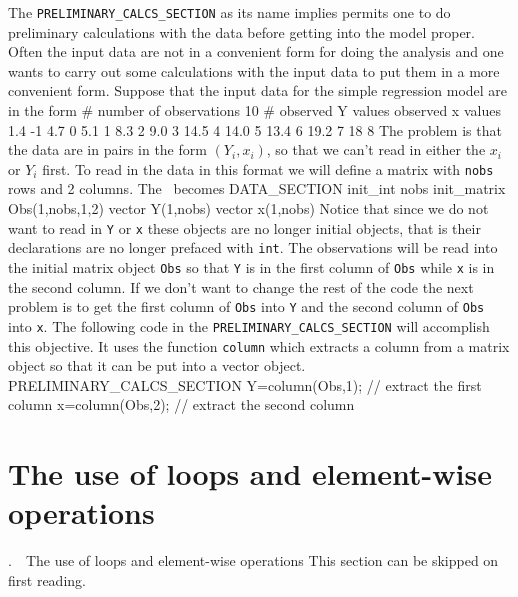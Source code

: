 \documentclass[12pt]{book}
\makeatletter
\def\mysection#1{\section{#1}{\bigbf \medbreak\noindent\number\c@chapter.\number\c@section\ \ #1\medbreak}}
\makeatother
\begin{document}
The {\tt PRELIMINARY\_CALCS\_SECTION} as its name implies
permits one to do preliminary calculations with the data
before getting into
the model proper.  Often the input data are not in a convenient form
for doing the analysis and one wants to carry out some calculations with
the input data to put them in a more convenient form.
Suppose that the input data for the simple regression model are in the form
\beginexample
# number of observations
     10
# observed Y values  observed x values
    1.4                    -1
    4.7                     0
    5.1                     1
    8.3                     2
    9.0                     3
    14.5                    4
    14.0                    5
    13.4                    6
    19.2                    7
    18                      8
\endexample
\noindent The problem is that the data are in pairs in the 
form $(Y_i,x_i)$, so that we can't read in either the 
$x_i$ or $Y_i$ first.  To read in the data in this format 
we will define a matrix  with {\tt nobs} rows and 2
columns.
The  \DS\ becomes
\beginexample
DATA\_SECTION
  init_int nobs
  init_matrix Obs(1,nobs,1,2) 
  vector Y(1,nobs)
  vector x(1,nobs)
\endexample
\noindent Notice that since we do not want to read in {\tt Y} or
{\tt x} these objects are no longer initial objects, that is their
declarations are no longer prefaced with {\tt int}. 
The observations will be read into the initial matrix object {\tt Obs}
so that {\tt Y}  is in the first column of {\tt Obs} while
{\tt x} is in the second column.
If we don't want to change the rest of the code the next problem is to
get the first column of {\tt Obs} into {\tt Y} and the second column
of {\tt Obs} into {\tt x}.
The following code in the {\tt PRELIMINARY\_CALCS\_SECTION}
will accomplish this objective. It uses the function {\tt column}
which extracts a column from a matrix object so that it can be put into a
vector object. 
\beginexample
PRELIMINARY\_CALCS\_SECTION
 Y=column(Obs,1); // extract the first column
 x=column(Obs,2); // extract the second column
\endexample
\mysection{The use of loops and element-wise operations}
This section can be skipped on first reading.
\end{document}
